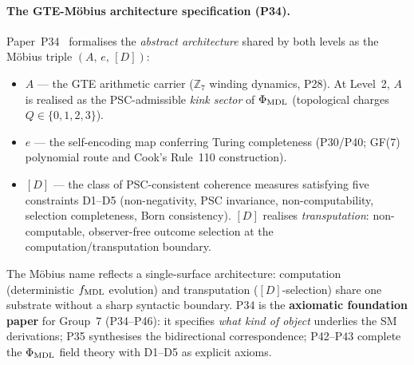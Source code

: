 \paragraph{The GTE-Möbius architecture specification (P34).}
Paper~P34~\cite{SpivackGTEMobius} formalises the \emph{abstract architecture} shared
by both levels as the Möbius triple $(A,\,e,\,[D])$:
\begin{itemize}[noitemsep,topsep=2pt]
  \item \textbf{$A$} --- the GTE arithmetic carrier ($\mathbb{Z}_7$ winding dynamics,
    P28).  At Level~2, $A$ is realised as the PSC-admissible \emph{kink sector} of
    $\Phi_{\rm MDL}$ (topological charges $Q \in \{0,1,2,3\}$).
  \item \textbf{$e$} --- the self-encoding map conferring Turing completeness
    (P30/P40; GF(7) polynomial route and Cook's Rule~110 construction).
  \item \textbf{$[D]$} --- the class of PSC-consistent coherence measures satisfying
    five constraints D1--D5 (non-negativity, PSC invariance, non-computability,
    selection completeness, Born consistency).  $[D]$ realises \emph{transputation}:
    non-computable, observer-free outcome selection at the computation/transputation
    boundary.
\end{itemize}
The Möbius name reflects a single-surface architecture: computation (deterministic
$f_{\rm MDL}$ evolution) and transputation ($[D]$-selection) share one substrate
without a sharp syntactic boundary.  P34 is the \textbf{axiomatic foundation
paper} for Group~7 (P34--P46): it specifies \emph{what kind of object} underlies the
SM derivations; P35 synthesises the bidirectional correspondence; P42--P43 complete
the $\Phi_{\rm MDL}$ field theory with D1--D5 as explicit axioms.

